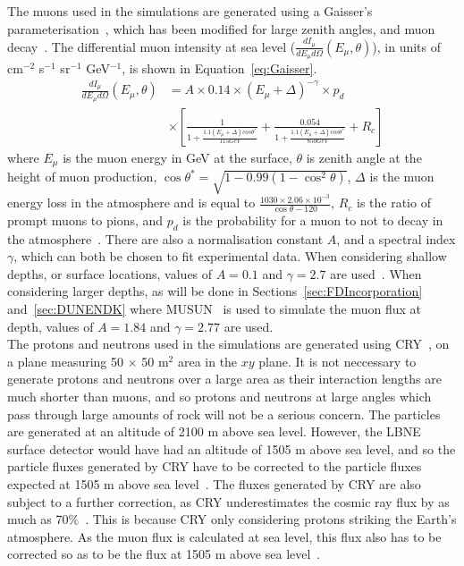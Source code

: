 The muons used in the simulations are generated using a Gaisser's parameterisation~\citep{Gaisser}, which has been modified for large zenith angles, and muon decay~\citep{PhysRevD.58.092005}. The differential muon intensity at sea level ($\frac{dI_{\mu}}{dE_{\mu} d\Omega}(E_{\mu}, \theta)$), in units of cm$^{-2}$ s$^{-1}$ sr$^{-1}$ GeV$^{-1}$, is shown in Equation~\ref{eq:Gaisser}.
\begin{equation}
   \begin{aligned}
      \label{eq:Gaisser}
      \frac{dI_{\mu}}{dE_{\mu} d\Omega}(E_{\mu}, \theta) &=
      A \times 0.14\times (E_{\mu} + \Delta)^{-\gamma} \times p_{d} \\
      &\times \left[ \frac{1}{1 + \frac{ 1.1(E_{\mu}+\Delta)cos\theta^{*} }{ 115 GeV } } +
      \frac{0.054}{1 + \frac{1.1(E_{\mu}+\Delta)cos\theta^{*}}{850 GeV}} + R_{c} \right]
   \end{aligned}
\end{equation} 
where $E_{\mu}$ is the muon energy in GeV at the surface, $\theta$ is zenith angle at the height of muon production, $\cos\theta^{*} = \sqrt{1-0.99(1-\cos^{2}\theta)}$, $\Delta$ is the muon energy loss in the atmosphere and is equal to $\frac{1030\times2.06\times10^{-3}}{\cos\theta-120}$, $R_{c}$ is the ratio of prompt muons to pions, and $p_d$ is the probability for a muon to not to decay in the atmosphere~\citep{PhysRevLett.51.227}. There are also a normalisation constant $A$, and a spectral index $\gamma$, which can both be chosen to fit experimental data. When considering shallow depths, or surface locations, values of $A=0.1$ and $\gamma=2.7$ are used~\citep{Gaisser}. When considering larger depths, as will be done in Sections~\ref{sec:FDIncorporation} and~\ref{sec:DUNENDK} where MUSUN~\citep{MUSUN, MUSUN2} is used to simulate the muon flux at depth, values of $A=1.84$ and $\gamma=2.77$ are used. \\

The protons and neutrons used in the simulations are generated using CRY~\citep{CRY,CRY2}, on a plane measuring 50 $\times$ 50 m$^{2}$ area in the $xy$ plane. It is not neccessary to generate protons and neutrons over a large area as their interaction lengths are much shorter than muons, and so protons and neutrons at large angles which pass through large amounts of rock will not be a serious concern. The particles are generated at an altitude of 2100 m above sea level. However, the LBNE surface detector would have had an altitude of 1505 m above sea level, and so the particle fluxes generated by CRY have to be corrected to the particle fluxes expected at 1505 m above sea level~\citep{MartinsThesis}. The fluxes generated by CRY are also subject to a further correction, as CRY underestimates the cosmic ray flux by as much as 70\%~\citep{LBNE7517}. This is because CRY only considering protons striking the Earth's atmosphere. As the muon flux is calculated at sea level, this flux also has to be corrected so as to be the flux at 1505 m above sea level~\citep{MartinsThesis}. \\

